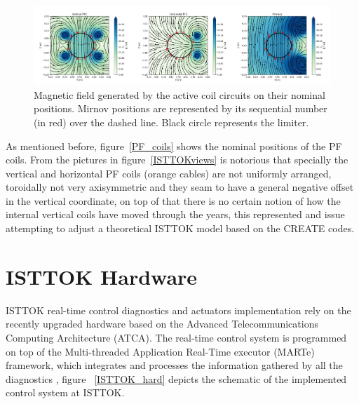 \begin{figure}[htbp]
	\centering
	\includegraphics[width=1.12\textwidth]{Chp4/PF_fieldLines.png}
	\caption{ Magnetic field generated by the active coil circuits on their nominal positions. Mirnov positions are represented by its sequential number (in red) over the dashed line. Black circle represents the limiter.\label{PF_lines}  }
\end{figure}



As mentioned before, figure~\ref{PF_coils} shows the  nominal positions of the PF coils. From the pictures in figure~\ref{ISTTOKviews} is notorious that specially the vertical and horizontal PF coils (orange cables) are not uniformly arranged, toroidally not very axisymmetric and they seam to have a general negative offset in the vertical coordinate, on top of that there is no certain notion of how the internal vertical coils have moved through the years, this represented and issue  attempting to adjust a theoretical ISTTOK model based on the CREATE codes.\smallskip





\section{ISTTOK Hardware }

ISTTOK real-time control diagnostics and actuators  implementation rely  on the recently upgraded hardware based on the Advanced Telecommunications Computing Architecture (ATCA).   The real-time control system is programmed on top of the Multi-threaded Application Real-Time executor (MARTe) framework,  which  integrates and processes the information gathered by all the  diagnostics \cite{Ivo2}, figure ~\ref{ISTTOK_hard} depicts the schematic of the implemented control system at ISTTOK.

